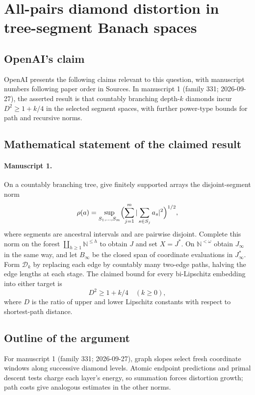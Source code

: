 \documentclass[11pt]{article}
\begin{document}
\section*{All-pairs diamond distortion in tree-segment Banach spaces}

\subsection{OpenAI's claim}
OpenAI presents the following claims relevant to this question, with manuscript numbers following paper order in Sources. In manuscript 1 (family 331; 2026-09-27), the asserted result is that countably branching depth-$k$ diamonds incur $D^2\ge1+k/4$ in the selected segment spaces, with further power-type bounds for path and recursive norms.

\subsection{Mathematical statement of the claimed result}
\paragraph{Manuscript 1.}
On a countably branching tree, give finitely supported arrays the disjoint-segment norm
\[
 \rho(a)=\sup_{S_1,\ldots,S_m}\Bigl(\sum_{j=1}^m|\sum_{s\in S_j}a_s|^2\Bigr)^{1/2},
\]
where segments are ancestral intervals and are pairwise disjoint. Complete this norm on the forest $\coprod_{h\ge1}\mathbb N^{\le h}$ to obtain $J$ and set $X=J^*$. On $\mathbb N^{<\omega}$ obtain $J_{\infty}$ in the same way, and let $B_{\infty}$ be the closed span of coordinate evaluations in $J_{\infty}^*$. Form $\mathcal D_k$ by replacing each edge by countably many two-edge paths, halving the edge lengths at each stage. The claimed bound for every bi-Lipschitz embedding into either target is
\[
 D^2\ge1+k/4\quad(k\ge0),
\]
where $D$ is the ratio of upper and lower Lipschitz constants with respect to shortest-path distance.

\subsection{Outline of the argument}
For manuscript 1 (family 331; 2026-09-27), graph slopes select fresh coordinate windows along successive diamond levels. Atomic endpoint predictions and primal descent tests charge each layer's energy, so summation forces distortion growth; path costs give analogous estimates in the other norms.
\end{document}
